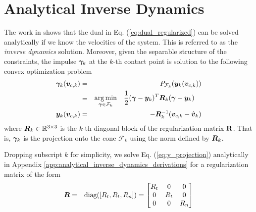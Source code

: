 \section{Analytical Inverse Dynamics}
\label{sec:analytical_inverse_dynamics}

The work in \cite{bib:todorov2014} shows that the dual in Eq.
(\ref{eq:dual_regularized}) can be solved analytically if we know the velocities
of the system. This is referred to as the \textit{inverse dynamics} solution.
Moreover, given the separable structure of the constraints, the impulse
${\bm\gamma}_k$ at the $k\text{-th}$ contact point is solution to the following
convex optimization problem
\begin{eqnarray}
	\bgamma_k(\vf{v}_{c,k})&=& P_{\mathcal{F}_k}(\vf{y}_k(\vf{v}_{c,k})) \nonumber\\
	&=&\begin{aligned}
		\argmin_{\bgamma\in\mathcal{F}_k} \quad &
	\frac{1}{2}(\bgamma-\vf{y}_k)^T\vf{R}_k(\bgamma-\vf{y}_k) \end{aligned}
    \label{eq:y_projection}\\
	\vf{y}_k(\vf{v}_{c,k}) &=& -\vf{R}_k^{-1}(\vf{v}_{c,k}-\hat{\vf{v}}_k)    
\end{eqnarray}
where ${\bm{R}}_k\in\mathbb{R}^{3\times3}$ is the $k\text{-th}$ diagonal block of
the regularization matrix ${\mathbf{R}}$. That is, ${\bm\gamma}_k$ is the projection onto
the cone $\mathcal{F}_k$ using the norm defined by ${\bm{R}}_k$.

Dropping subscript $k$ for simplicity, we solve Eq. (\ref{eq:y_projection})
analytically in Appendix \ref{app:analytical_inverse_dynamics_derivations} for a
regularization matrix of the form
\begin{eqnarray}	
	\vf{R} &=& \text{diag}([R_t, R_t, R_n]) = 
	\begin{bmatrix}
		R_t &   0 & 0\\
		  0 & R_t & 0\\
		  0 &   0 & R_n
	\end{bmatrix}
    \label{eq:Rk}
\end{eqnarray} 

